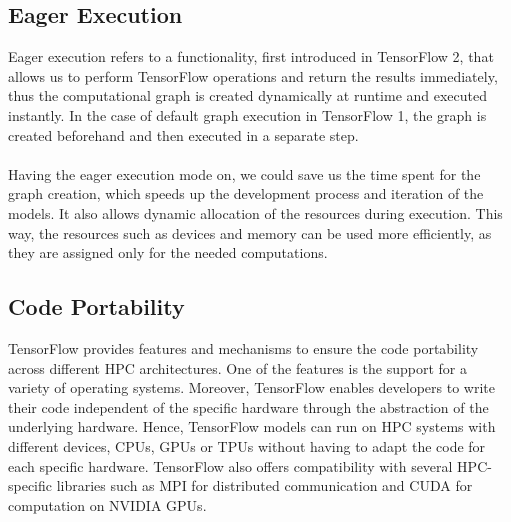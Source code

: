 \documentclass[ieeetran]{article}
\begin{document}
\subsection{Eager Execution} %
\label{sub:eager_execution}
Eager execution refers to a functionality, first introduced in TensorFlow 2, that allows us to perform TensorFlow operations and return the results immediately, thus the computational graph is created dynamically at runtime and executed instantly. In the case of default graph execution in TensorFlow 1, the graph is created beforehand and then executed in a separate step. 
\\ \\Having the eager execution mode on, we could save us the time spent for the graph creation, which speeds up the development process and iteration of the models. It also allows dynamic allocation of the resources during execution. This way, the resources such as devices and memory can be used more efficiently, as they are assigned only for the needed computations.

\subsection{Code Portability} %
\label{sub:code_portability}
TensorFlow provides features and mechanisms to ensure the code portability across different HPC architectures. One of the features is the support for a variety of operating systems. Moreover, TensorFlow enables developers to write their code independent of the specific hardware through the abstraction of the underlying hardware. Hence, TensorFlow models can run on HPC systems with different devices, CPUs, GPUs or TPUs without having to adapt the code for each specific hardware. TensorFlow also offers compatibility with several HPC-specific libraries such as MPI for distributed communication and CUDA for computation on NVIDIA GPUs.
\end{document}
